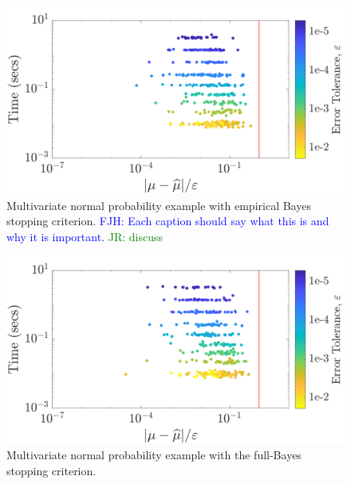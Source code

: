 \documentclass[graybox,footinfo]{svmult}
\newcommand{\FJHNote}[1]{{\textcolor{blue}{FJH: #1}}}
\newcommand{\JRNote}[1]{{\textcolor{green}{JR: #1}}}
\begin{document}
\begin{figure}
\centering
\includegraphics[width=0.95\linewidth]{"figures/Sobol/Sobol_MVN_guaranteed_time_MLE__d2_r1_2019-Sep-1"}
\caption[Sobol: MVN guaranteed: MLE]{Multivariate normal probability example with empirical Bayes stopping criterion. \FJHNote{Each caption should say what this is and why it is important.} \JRNote{discuss }}
\label{FJ:fig:Sobol-mvn-guaranteed-MLE}
\end{figure}
\begin{figure}
\centering
\includegraphics[width=0.95\linewidth]{"figures/Sobol/Sobol_MVN_guaranteed_time_full__d2_r1_2019-Sep-1"}
\caption[Sobol: MVN guaranteed: Full Bayes]{Multivariate normal probability example with the full-Bayes stopping criterion.}
\label{FJ:fig:Sobol-mvn-guaranteed-FB}
\end{figure}
\end{document}
